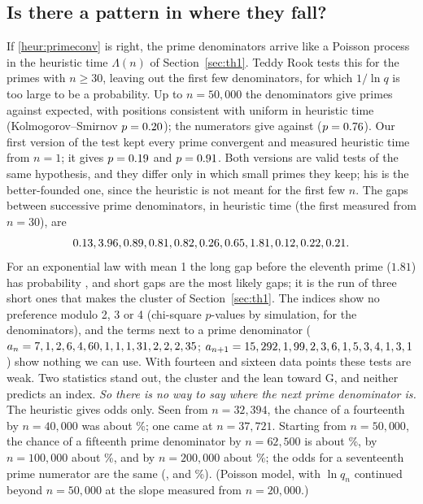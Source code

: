 \subsection{Is there a pattern in where they fall?}

If \cref{heur:primeconv} is right, the prime denominators arrive like a Poisson process in the heuristic time $\Lambda(n)$ of Section~\ref{sec:th1}. Teddy Rook tests this for the primes with $n \ge 30$, leaving out the first few denominators, for which $1/\ln q$ is too large to be a probability. Up to $n = 50{,}000$ the denominators give \FiRookNQ{} primes against \FiRookExpQ{} expected, with positions consistent with uniform in heuristic time (Kolmogorov--Smirnov $p = 0.20$); the numerators give \FiRookNP{} against \FiRookExpP{} ($p = 0.76$). Our first version of the test kept every prime convergent and measured heuristic time from $n = 1$; it gives $p = 0.19$ and $p = 0.91$. Both versions are valid tests of the same hypothesis, and they differ only in which small primes they keep; his is the better-founded one, since the heuristic is not meant for the first few $n$. The gaps between successive prime denominators, in heuristic time (the first measured from $n = 30$), are
\[
  0.13, 3.96, 0.89, 0.81, 0.82, 0.26, 0.65, 1.81, 0.12, 0.22, 0.21 .
\]
For an exponential law with mean 1 the long gap before the eleventh prime ($1.81$) has probability \FoLongGap, and short gaps are the most likely gaps; it is the run of three short ones that makes the cluster of Section~\ref{sec:th1}. The indices show no preference modulo 2, 3 or 4 (chi-square $p$-values by simulation, \FoModTests{} for the denominators), and the terms next to a prime denominator ($a_n = 7, 1, 2, 6, 4, 60, 1, 1, 1, 31, 2, 2, 2, 35$; $a_{n+1} = 15, 292, 1, 99, 2, 3, 6, 1, 5, 3, 4, 1, 3, 1$) show nothing we can use. With fourteen and sixteen data points these tests are weak. Two statistics stand out, the cluster and the lean toward G, and neither predicts an index. \emph{So there is no way to say where the next prime denominator is.} The heuristic gives odds only. Seen from $n = 32{,}394$, the chance of a fourteenth by $n = 40{,}000$ was about \TwOddsForty\%; one came at $n = 37{,}721$. Starting from $n = 50{,}000$, the chance of a fifteenth prime denominator by $n = 62{,}500$ is about \FiOddsQSixtyTwo\%, by $n = 100{,}000$ about \FiOddsQHundred\%, and by $n = 200{,}000$ about \FiOddsQTwoHundred\%; the odds for a seventeenth prime numerator are the same (\FiOddsPSixtyTwo, \FiOddsPHundred{} and \FiOddsPTwoHundred\%). (Poisson model, with $\ln q_n$ continued beyond $n = 50{,}000$ at the slope measured from $n = 20{,}000$.)

